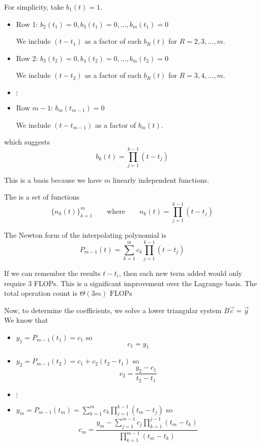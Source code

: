 For simplicity, take \( b_1(t) = 1 \).
\begin{itemize}
    \item Row 1: \( b_2(t_1) = 0, b_3(t_1) = 0, \ldots, b_m(t_1) = 0 \)

          We include \( (t - t_1) \) as a factor of each \( b_R(t) \) for \( R = 2, 3, \ldots, m \).

    \item Row 2: \( b_3(t_2) = 0, b_4(t_2) = 0, \ldots, b_m(t_2) = 0 \)

          We include \( (t - t_2) \) as a factor of each \( b_R(t) \) for \( R = 3, 4, \ldots, m \).

    \item \( \vdots \)

    \item Row \( m-1 \): \( b_m(t_{m-1}) = 0 \)

          We include \( (t - t_{m-1}) \) as a factor of \( b_m(t) \).
\end{itemize} which suggests \[
    b_k(t) = \prod_{j=1}^{k-1} (t - t_j)
\]

\begin{remark}
    This is a basis because we have \( m \) linearly independent functions.
\end{remark}

\begin{definition}
    The  is a set of functions \[
        \{ n_k(t) \}_{k=1}^{m} \qquad \text{where} \qquad n_k(t) = \prod_{j=1}^{k-1} (t - t_j)
    \]
\end{definition}

The Newton form of the interpolating polynomial is \[
    P_{m-1}(t) = \sum_{k=1}^{m} c_k \prod_{j=1}^{k-1} (t - t_j)
\]

\begin{remark}
    If we can remember the results \( t - t_i \), then each new term added would only require \( 3 \) FLOPs. This is a significant improvement over the Lagrange basis. The total operation count is \(
        \Theta(3m) \text{ FLOPs}
    \)
\end{remark}

Now, to determine the coefficients, we solve a lower triangular system \( B\vec{c} = \vec{y} \)
We know that
\begin{itemize}
    \item \( y_1 = P_{m-1}(t_1) = c_1 \) so \[
              c_1 = y_1
          \]
    \item \( y_2 = P_{m-1}(t_2) = c_1 + c_2(t_2 - t_1) \) so \[
              c_2 = \frac{y_2 - c_1}{t_2 - t_1}
          \]
    \item \( \vdots \)
    \item \( \displaystyle y_m = P_{m-1}(t_m) = \sum_{k=1}^{m} c_k \prod_{j=1}^{k-1} (t_m - t_j) \) so \[
              c_m = \frac{\displaystyle y_m - \sum_{j=1}^{m-1} c_j \prod_{k=1}^{j-1} (t_m - t_k)}{\displaystyle \prod_{k=1}^{m-1} (t_m - t_k)}
          \]
\end{itemize}